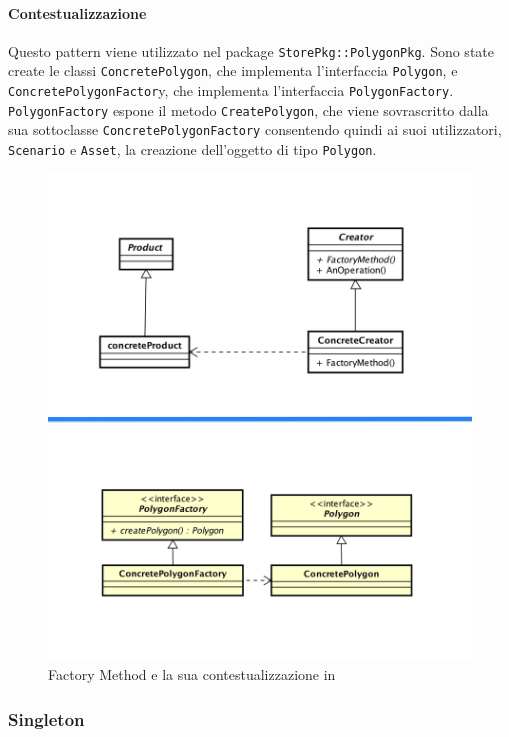 \paragraph{Contestualizzazione}
Questo pattern viene utilizzato nel package \texttt{StorePkg::PolygonPkg}. Sono state create le classi \texttt{ConcretePolygon}, che implementa l'interfaccia \texttt{Polygon}, e \texttt{ConcretePolygonFactor}y, che implementa l'interfaccia \texttt{PolygonFactory}. \texttt{PolygonFactory} espone il metodo \texttt{CreatePolygon}, che viene sovrascritto dalla sua sottoclasse \texttt{ConcretePolygonFactory} consentendo quindi ai suoi utilizzatori, \texttt{Scenario} e \texttt{Asset}, la creazione dell'oggetto di tipo \texttt{Polygon}.
	\begin{figure}[H]
		\label{builder_compara}
		\centering
		\includegraphics[scale=0.14]{img/factoryComparati.png}
		\caption{Factory Method e la sua contestualizzazione in \progetto}
	\end{figure}


\newpage
\subsubsection{Singleton}
